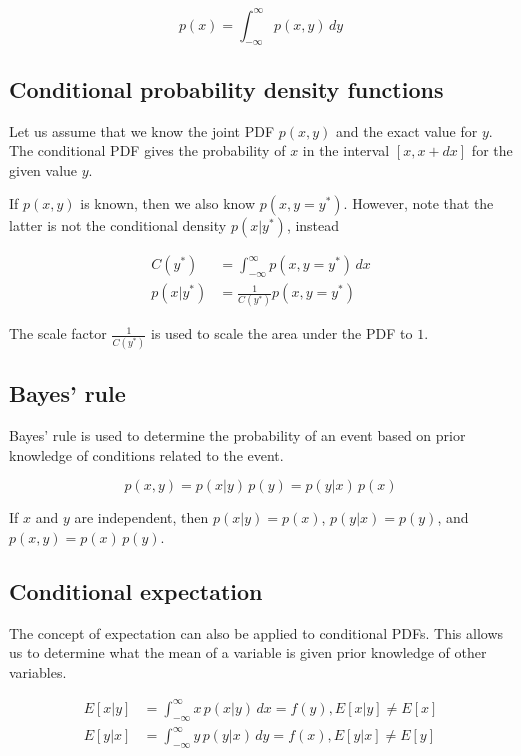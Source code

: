 \begin{equation*}
  p(x) = \int_{-\infty}^\infty p(x, y) \,dy
\end{equation*}

\subsection{Conditional probability density functions}

Let us assume that we know the joint PDF $p(x, y)$ and the exact value for $y$.
The conditional PDF gives the probability of $x$ in the interval $[x, x + dx]$
for the given value $y$.

If $p(x, y)$ is known, then we also know $p(x, y = y^\ast)$. However, note that
the latter is not the conditional density $p(x|y^\ast)$, instead

\begin{align*}
  C(y^\ast) &= \int_{-\infty}^\infty p(x, y = y^\ast) \,dx \\
  p(x|y^\ast) &= \frac{1}{C(y^\ast)} p(x, y = y^\ast)
\end{align*}

The scale factor $\frac{1}{C(y^\ast)}$ is used to scale the area under the PDF
to $1$.

\subsection{Bayes' rule}

Bayes' rule is used to determine the probability of an event based on prior
knowledge of conditions related to the event.

\begin{equation*}
  p(x, y) = p(x|y) \,p(y) = p(y|x) \,p(x)
\end{equation*}

If $x$ and $y$ are independent, then $p(x|y) = p(x)$, $p(y|x) = p(y)$, and
$p(x, y) = p(x) \,p(y)$.

\subsection{Conditional expectation}

The concept of expectation can also be applied to conditional PDFs. This allows
us to determine what the mean of a variable is given prior knowledge of other
variables.

\begin{align*}
  E[x|y] &= \int_{-\infty}^\infty x \,p(x|y) \,dx = f(y), E[x|y] \neq E[x] \\
  E[y|x] &= \int_{-\infty}^\infty y \,p(y|x) \,dy = f(x), E[y|x] \neq E[y]
\end{align*}

